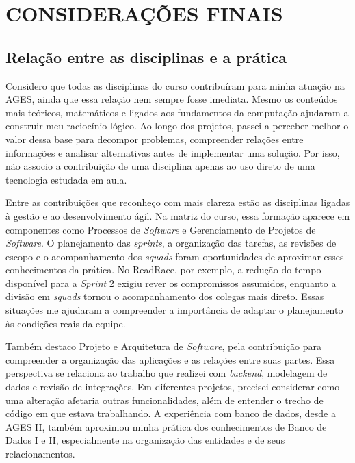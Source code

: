 \chapter[Considerações finais]{CONSIDERAÇÕES FINAIS}

\section{Relação entre as disciplinas e a prática}

Considero que todas as disciplinas do curso contribuíram para minha atuação na \ac{AGES}, ainda que essa relação nem sempre fosse imediata. Mesmo os conteúdos mais teóricos, matemáticos e ligados aos fundamentos da computação ajudaram a construir meu raciocínio lógico. Ao longo dos projetos, passei a perceber melhor o valor dessa base para decompor problemas, compreender relações entre informações e analisar alternativas antes de implementar uma solução. Por isso, não associo a contribuição de uma disciplina apenas ao uso direto de uma tecnologia estudada em aula.

Entre as contribuições que reconheço com mais clareza estão as disciplinas ligadas à gestão e ao desenvolvimento ágil. Na matriz do curso, essa formação aparece em componentes como Processos de \textit{Software} e Gerenciamento de Projetos de \textit{Software}. O planejamento das \textit{sprints}, a organização das tarefas, as revisões de escopo e o acompanhamento dos \textit{squads} foram oportunidades de aproximar esses conhecimentos da prática. No ReadRace, por exemplo, a redução do tempo disponível para a \textit{Sprint} 2 exigiu rever os compromissos assumidos, enquanto a divisão em \textit{squads} tornou o acompanhamento dos colegas mais direto. Essas situações me ajudaram a compreender a importância de adaptar o planejamento às condições reais da equipe.

Também destaco Projeto e Arquitetura de \textit{Software}, pela contribuição para compreender a organização das aplicações e as relações entre suas partes. Essa perspectiva se relaciona ao trabalho que realizei com \textit{backend}, modelagem de dados e revisão de integrações. Em diferentes projetos, precisei considerar como uma alteração afetaria outras funcionalidades, além de entender o trecho de código em que estava trabalhando. A experiência com banco de dados, desde a \ac{AGES} II, também aproximou minha prática dos conhecimentos de Banco de Dados I e II, especialmente na organização das entidades e de seus relacionamentos.

